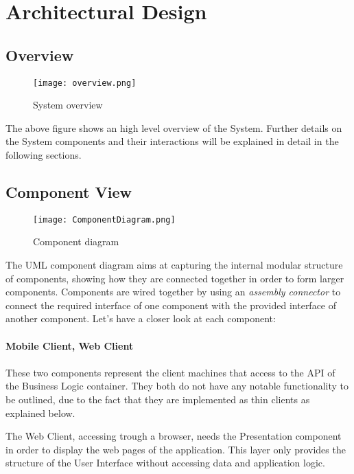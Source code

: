 \section{Architectural Design}

\subsection{Overview}

\begin{figure}[H]
	\centering
	\texttt{[image: overview.png]}
	\caption{System overview}
\end{figure}

The above figure shows an high level overview of the System. Further details on the System components and their interactions will be explained in detail in the following sections.

\subsection{Component View}

\begin{figure}[H]
	\centering
	\texttt{[image: ComponentDiagram.png]}
	\caption{Component diagram}
\end{figure}

The UML component diagram aims at capturing the internal modular structure of components, showing how they are connected together in order to form larger components. Components are wired together by using an \textit{assembly connector} to connect the required interface of one component with the provided interface of another component.
Let's have a closer look at each component:
\\ \\
\textbf{Mobile Client, Web Client}
\\ \\
These two components represent the client machines that access to the API of the Business Logic container. They both do not have any notable functionality to be outlined, due to the fact that they are implemented as thin clients as explained below.

The Web Client, accessing trough a browser, needs the Presentation component in order to display the web pages of the application. This layer only provides the structure of the User Interface without accessing data and application logic. 

